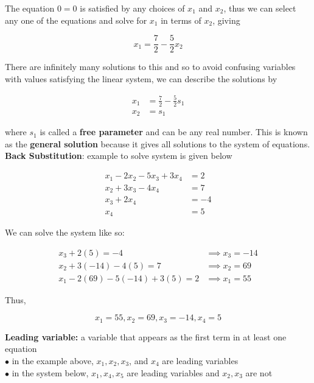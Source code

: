         The equation $0=0$ is satisfied by any choices of $x_1$ and $x_2$, thus we can select any one of the equations and solve for $x_1$ in terms of $x_2$, giving

        \[
            x_1 = \frac{7}{2} - \frac{5}{2}x_2
        \]

        There are infinitely many solutions to this and so to avoid confusing variables with values satisfying the linear system, we can describe the solutions by

        \begin{align*}
            x_1 &= \frac{7}{2} - \frac{5}{2}s_1 \\
            x_2 &= s_1
        \end{align*}

        where $s_1$ is called a \textbf{free parameter} and can be any real number. This is known as the \textbf{general solution} because it gives all solutions to the system of equations. \\

        \textbf{Back Substitution}: example to solve system is given below

        \begin{align*}
            x_1 - 2x_2 - 5x_3 + 3x_4    &= 2 \\
            x_2 + 3x_3 - 4x_4           &= 7 \\
            x_3 + 2x_4                  &= -4 \\
            x_4                         &= 5
        \end{align*}

        We can solve the system like so:

        \begin{align*}
            x_3 + 2(5)  = -4  &\implies x_3 = -14 \\
            x_2 + 3(-14) - 4(5) = 7 &\implies x_2 = 69 \\
            x_1 - 2(69) - 5(-14) + 3(5) = 2 &\implies x_1 = 55
        \end{align*}

        Thus,

        \[
            x_1 = 55, x_2 = 69, x_3 = -14, x_4 = 5
        \]

        \textbf{Leading variable:} a variable that appears as the first term in at least one equation \\
        $\bullet$ in the example above, $x_1, x_2, x_3$, and $x_4$ are leading variables \\
        $\bullet$ in the system below, $x_1, x_4, x_5$ are leading variables and $x_2,x_3$ are not

